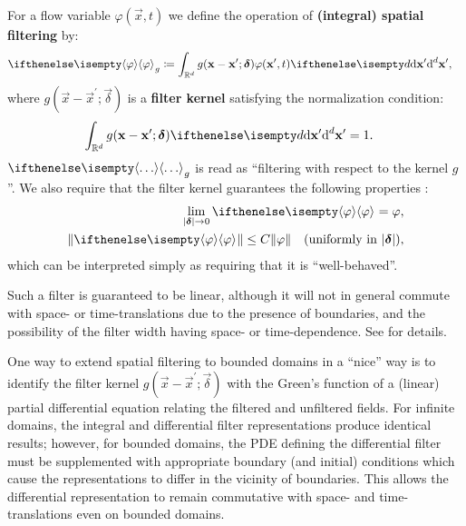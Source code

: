 \begin{definition}\label{def:spatialFilter}
    For a flow variable $\varphi(\vec{x},t)$ we define the operation of \textbf{(integral) spatial filtering} by:
    \begin{align}
        \filter{\varphi}_g
        &\coloneqq
        \int_{\mathbb{R}^d}
            g(\vec{x} - \vec{x}^\prime; \vec{\delta})
            \varphi(\vec{x}^\prime, t)
        \diff[d]{\vec{x}^\prime},
        \label{eq:spatialFilterDefinition}
    \end{align}
    where $g(\vec{x} - \vec{x}^\prime; \vec{\delta})$ is a \textbf{filter kernel} satisfying the normalization condition:
    \begin{align}
        \int_{\mathbb{R}^d}
            g(\vec{x} - \vec{x}^\prime; \vec{\delta})
        \diff[d]{\vec{x}^\prime}
        &=
        1.
    \end{align}
    $\filter{\dots}_g$ is read as ``filtering with respect to the kernel $g$''.
    We also require that the filter kernel guarantees the following properties \parencite{bk:BerselliEtAlLES}:
    \begin{align}
        \lim_{\abs{\vec{\delta}} \to 0} \filter{\varphi}
        =
        \varphi,
        \\
        \norm{\filter{\varphi}}
        \leq
        C \norm{\varphi}
        \quad 
        \text{(uniformly in $\abs{\vec{\delta}}$)},
    \end{align}
    which can be interpreted simply as requiring that it is ``well-behaved''.
\end{definition}
    
\begin{aside}
    Such a filter is guaranteed to be linear, although it will not in general commute with space- or time-translations due to the presence of boundaries, and the possibility of the filter width having space- or time-dependence.
    See \textcite{ar:FurebyTabor1997} for details.

    One way to extend spatial filtering to bounded domains in a ``nice'' way is to identify the filter kernel $g(\vec{x} - \vec{x}^\prime; \vec{\delta})$ with the Green's function of a (linear) partial differential equation relating the filtered and unfiltered fields.
    For infinite domains, the integral and differential filter representations produce identical results; however, for bounded domains, the PDE defining the differential filter must be supplemented with appropriate boundary (and initial) conditions which cause the representations to differ in the vicinity of boundaries.
    This allows the differential representation to remain commutative with space- and time-translations even on bounded domains.
\end{aside}

